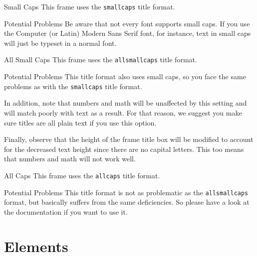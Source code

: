 \documentclass[10pt]{beamer}
\begin{document}
{
\begin{frame}{Small Caps}
  This frame uses the \texttt{smallcaps} title format.

  \begin{alertblock}{Potential Problems}
    Be aware that not every font supports small caps. If you use the Computer (or Latin) Modern Sans Serif font, for instance, text in small caps will just be typeset in a normal font.
  \end{alertblock}
\end{frame}
}

{
\begin{frame}{All Small Caps}
  This frame uses the \texttt{allsmallcaps} title format.

  \begin{alertblock}{Potential Problems}
    This title format also uses small caps, so you face the same problems as with the \texttt{smallcaps} title format.

    \medskip

    In addition, note that numbers and math will be unaffected by this setting and will match
    poorly with text as a result. For that reason, we suggest you make sure titles are all
    plain text if you use this option.

    \medskip

    Finally, observe that the height of the frame title box will be modified to account for the
    decreased text height since there are no capital letters. This too means that numbers and
    math will not work well.
  \end{alertblock}
\end{frame}
}

{
\begin{frame}{All Caps}
  This frame uses the \texttt{allcaps} title format.

  \begin{alertblock}{Potential Problems}
    This title format is not as problematic as the \texttt{allsmallcaps} format, but basically suffers from the same deficiencies. So please have a look at the documentation if you want to use it.
  \end{alertblock}
\end{frame}
}

\section{Elements}
\end{document}
